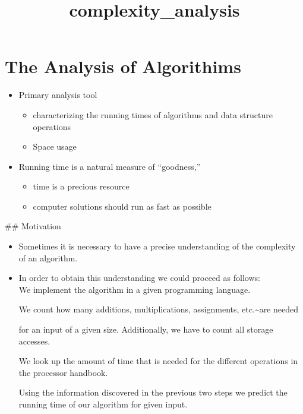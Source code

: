 \documentclass[11pt]{article}
\title{complexity\_analysis}
\providecommand{\tightlist}{%
      \setlength{\itemsep}{0pt}\setlength{\parskip}{0pt}}
\begin{document}
    
    \maketitle
    
    

    
    \hypertarget{the-analysis-of-algorithims}{%
\section{The Analysis of
Algorithims}\label{the-analysis-of-algorithims}}

\begin{itemize}
\tightlist
\item
  Primary analysis tool

  \begin{itemize}
  \tightlist
  \item
    characterizing the running times of algorithms and data structure
    operations
  \item
    Space usage\\
  \end{itemize}
\item
  Running time is a natural measure of ``goodness,''

  \begin{itemize}
  \tightlist
  \item
    time is a precious resource
  \item
    computer solutions should run as fast as possible
  \end{itemize}
\end{itemize}

    \#\# Motivation

\begin{itemize}
\item
  Sometimes it is necessary to have a precise understanding of the
  complexity of an algorithm.
\item
  In order to obtain this understanding we could proceed as follows:\\

  We implement the algorithm in a given programming language.

  We count how many additions, multiplications, assignments,
  etc.\textasciitilde are needed

  for an input of a given size. Additionally, we have to count all
  storage accesses.

  We look up the amount of time that is needed for the different
  operations in the processor handbook.

  Using the information discovered in the previous two steps we predict
  the running time of our algorithm for given input.
\end{itemize}
\end{document}
